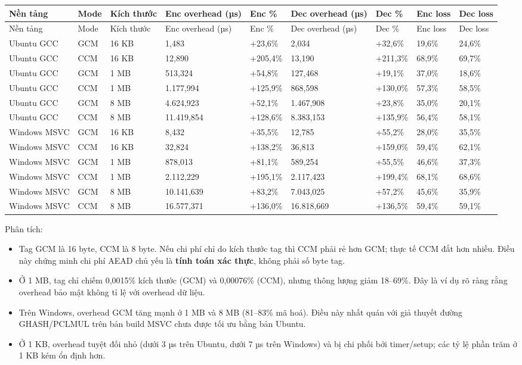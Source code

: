 \documentclass[12pt,a4paper,oneside]{report}
\begin{document}
\begin{longtable}{p{}p{}p{}p{}p{}p{}p{}p{}p{}}
\toprule
Nền tảng & Mode & Kích thước & Enc overhead (µs) & Enc \% & Dec overhead (µs) & Dec \% & Enc loss & Dec loss \\
\midrule
\endfirsthead
\toprule
Nền tảng & Mode & Kích thước & Enc overhead (µs) & Enc \% & Dec overhead (µs) & Dec \% & Enc loss & Dec loss \\
\midrule
\endhead
Ubuntu GCC & GCM & 16 KB & 1,483 & +23,6\% & 2,034 & +32,6\% & 19,6\% & 24,6\% \\
Ubuntu GCC & CCM & 16 KB & 12,890 & +205,4\% & 13,190 & +211,3\% & 68,9\% & 69,7\% \\
Ubuntu GCC & GCM & 1 MB & 513,324 & +54,8\% & 127,468 & +19,1\% & 37,0\% & 18,6\% \\
Ubuntu GCC & CCM & 1 MB & 1.177,994 & +125,9\% & 868,598 & +130,0\% & 57,3\% & 58,5\% \\
Ubuntu GCC & GCM & 8 MB & 4.624,923 & +52,1\% & 1.467,908 & +23,8\% & 35,0\% & 20,1\% \\
Ubuntu GCC & CCM & 8 MB & 11.419,854 & +128,6\% & 8.383,153 & +135,9\% & 56,4\% & 58,1\% \\
Windows MSVC & GCM & 16 KB & 8,432 & +35,5\% & 12,785 & +55,2\% & 28,0\% & 35,5\% \\
Windows MSVC & CCM & 16 KB & 32,824 & +138,2\% & 36,813 & +159,0\% & 59,4\% & 62,1\% \\
Windows MSVC & GCM & 1 MB & 878,013 & +81,1\% & 589,254 & +55,5\% & 46,6\% & 37,3\% \\
Windows MSVC & CCM & 1 MB & 2.112,229 & +195,1\% & 2.117,423 & +199,4\% & 68,1\% & 68,6\% \\
Windows MSVC & GCM & 8 MB & 10.141,639 & +83,2\% & 7.043,025 & +57,2\% & 45,6\% & 35,9\% \\
Windows MSVC & CCM & 8 MB & 16.577,371 & +136,0\% & 16.818,669 & +136,5\% & 59,4\% & 59,1\% \\
\bottomrule
\end{longtable}


Phân tích:


\begin{itemize}[leftmargin=*]
\item Tag GCM là 16 byte, CCM là 8 byte. Nếu chi phí chỉ do kích thước tag thì CCM phải rẻ hơn GCM; thực tế CCM đắt hơn nhiều. Điều này chứng minh chi phí AEAD chủ yếu là \textbf{tính toán xác thực}, không phải số byte tag.
\item Ở 1 MB, tag chỉ chiếm 0,0015\% kích thước (GCM) và 0,00076\% (CCM), nhưng thông lượng giảm 18–69\%. Đây là ví dụ rõ ràng rằng overhead bảo mật không tỉ lệ với overhead dữ liệu.
\item Trên Windows, overhead GCM tăng mạnh ở 1 MB và 8 MB (81–83\% mã hoá). Điều này nhất quán với giả thuyết đường GHASH/PCLMUL trên bản build MSVC chưa được tối ưu bằng bản Ubuntu.
\item Ở 1 KB, overhead tuyệt đối nhỏ (dưới 3 µs trên Ubuntu, dưới 7 µs trên Windows) và bị chi phối bởi timer/setup; các tỷ lệ phần trăm ở 1 KB kém ổn định hơn.
\end{itemize}
\end{document}

